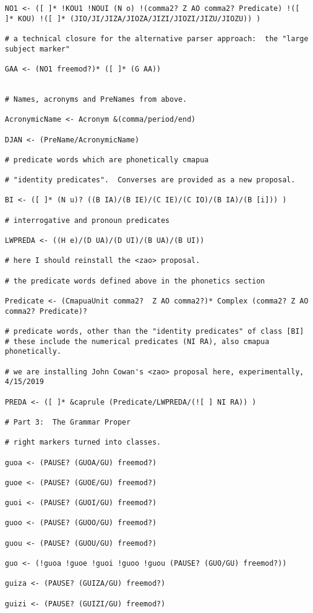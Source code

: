 \documentclass{article}
\begin{document}
\begin{verbatim}
NO1 <- ([ ]* !KOU1 !NOUI (N o) !(comma2? Z AO comma2? Predicate) !([ ]* KOU) !([ ]* (JIO/JI/JIZA/JIOZA/JIZI/JIOZI/JIZU/JIOZU)) )

# a technical closure for the alternative parser approach:  the "large subject marker"

GAA <- (NO1 freemod?)* ([ ]* (G AA))


# Names, acronyms and PreNames from above.

AcronymicName <- Acronym &(comma/period/end)

DJAN <- (PreName/AcronymicName)

# predicate words which are phonetically cmapua

# "identity predicates".  Converses are provided as a new proposal.

BI <- ([ ]* (N u)? ((B IA)/(B IE)/(C IE)/(C IO)/(B IA)/(B [i])) )

# interrogative and pronoun predicates

LWPREDA <- ((H e)/(D UA)/(D UI)/(B UA)/(B UI))

# here I should reinstall the <zao> proposal.

# the predicate words defined above in the phonetics section

Predicate <- (CmapuaUnit comma2?  Z AO comma2?)* Complex (comma2? Z AO comma2? Predicate)?

# predicate words, other than the "identity predicates" of class [BI]
# these include the numerical predicates (NI RA), also cmapua phonetically.

# we are installing John Cowan's <zao> proposal here, experimentally, 4/15/2019

PREDA <- ([ ]* &caprule (Predicate/LWPREDA/(![ ] NI RA)) )

# Part 3:  The Grammar Proper

# right markers turned into classes.

guoa <- (PAUSE? (GUOA/GU) freemod?)

guoe <- (PAUSE? (GUOE/GU) freemod?)

guoi <- (PAUSE? (GUOI/GU) freemod?)

guoo <- (PAUSE? (GUOO/GU) freemod?)

guou <- (PAUSE? (GUOU/GU) freemod?)

guo <- (!guoa !guoe !guoi !guoo !guou (PAUSE? (GUO/GU) freemod?))

guiza <- (PAUSE? (GUIZA/GU) freemod?)

guizi <- (PAUSE? (GUIZI/GU) freemod?)


\end{verbatim}
\end{document}
